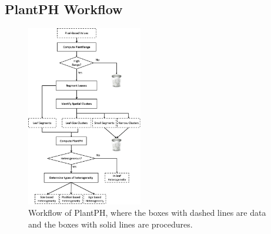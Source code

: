 \documentclass{bioinfo}
\begin{document}
\begin{methods}
%
%
%
%

\subsection{PlantPH Workflow}

\begin{figure}
  \centering
  \includegraphics[width=0.45\textwidth]{workflowchart-detail.png}\vspace{-0.1in}
  \caption{Workflow of PlantPH, where the boxes with dashed lines are data and the boxes with solid lines are procedures.}\label{fig:workflow}\vspace{-0.2in}
\end{figure}



\end{methods}
\end{document}
